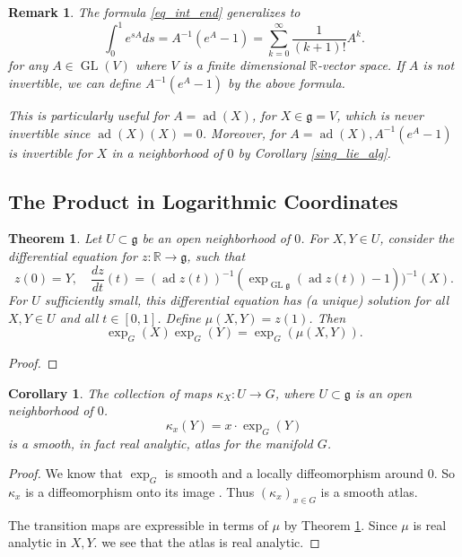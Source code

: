\documentclass{article}
\newtheorem{theorem}{Theorem}[section]
\newtheorem{remark}{Remark}[section]
\newtheorem{corollary}{Corollary}[section]
\numberwithin{equation}{section}
\DeclareMathOperator{\ad}{ad}
\DeclareMathOperator{\GL}{GL}
\begin{document}
\begin{remark}
The formula \eqref{eq_int_end} generalizes to 
\begin{equation*}
\int_0^1e^{sA}ds = A^{-1}(e^A-1)=\sum_{k=0}^\infty {\frac 1 {(k+1)!}}A^k.
\end{equation*}
for any $A\in\GL(V)$ where $V$ is a finite dimensional $\mathbb{R}$-vector space. If $A$ is not invertible, we can define $A^{-1}(e^A-1)$ by the above formula.\\
\par This is particularly useful for $A=\ad(X)$, for $X\in\mathfrak{g}=V$, which is never invertible since $\ad(X)(X)=0$. Moreover, for $A=\ad(X), A^{-1}(e^A-1)$ is invertible for $X$ in a neighborhood of $0$ by Corollary \ref{sing_lie_alg}.
\end{remark}

\subsection{The Product in Logarithmic Coordinates}

\begin{theorem}
Let $U\subset\mathfrak{g}$ be an open neighborhood of $0$. For $X,Y\in U$, consider the differential equation for $z:\mathbb{R}\to\mathfrak{g}$, such that
\begin{equation*}
z(0)=Y,\quad{\frac {dz} {dt}}(t) = (\ad z(t))^{-1}(\exp_{\GL{\mathfrak{g}}}(\ad z(t))-1))^{-1}(X).
\end{equation*}
For $U$ sufficiently small, this differential equation has (a unique) solution for all $X,Y\in U$ and all $t\in[0,1]$. Define $\mu(X,Y) = z(1)$. Then 
\begin{equation*}
\exp_G(X)\exp_G(Y) = \exp_G(\mu(X,Y)).
\end{equation*}
\label{product_exp_expression}
\end{theorem}

\begin{proof}
\end{proof}

\begin{corollary}
The collection of maps $\kappa_X:U\to G$, where $U\subset\mathfrak{g}$ is an open neighborhood of $0$. 
\begin{equation*}
\kappa_x(Y)= x\cdot\exp_G(Y)
\end{equation*}
is a smooth, in fact real analytic, atlas for the manifold $G$.
\end{corollary}

\begin{proof}
We know that $\exp_G$ is smooth and a locally diffeomorphism around $0$. So $\kappa_x$ is a diffeomorphism onto its image . Thus $(\kappa_x)_{x\in G}$ is a smooth atlas.\\
\par The transition maps are expressible in terms of $\mu$ by Theorem \ref{product_exp_expression}. Since $\mu$ is real analytic in $X,Y$. we see that the atlas is real analytic.
\end{proof}
\end{document}
